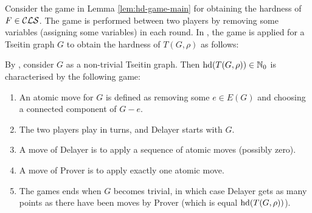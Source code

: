 \documentclass{report}
\begin{document}
Consider the game in Lemma \ref{lem:hd-game-main} for obtaining the hardness of $F \in \mathcal{CLS}$. The game is performed between two players by removing some variables (assigning some variables) in each round. In \cite{BeyersdorffKullmann2014PHP}, the game is applied for a Tseitin graph $G$ to obtain the hardness of $T(G,\rho)$ as follows:



\begin{lem}\label{lem:game-tseitin-hd}
By \cite{BeyersdorffKullmann2014PHP}, consider  $G$ as a non-trivial Tseitin graph. Then $\operatorname{hd}(T(G,\rho)) \in \mathbb{N}_0$ is characterised by the following game:
  \begin{enumerate}
  \item An atomic move for $G$ is defined as removing some $e \in E(G)$ and choosing a connected component of $G - e$. 
  \item The two players play in turns, and Delayer starts with $G$.
  \item A move of Delayer is to apply a sequence of atomic moves (possibly zero).
  \item A move of Prover is to apply exactly one atomic move.
  \item The games ends when $G$ becomes trivial, in which case Delayer gets as many points as there have been moves by Prover (which is equal $\operatorname{hd}(T(G,\rho))$).
  \end{enumerate}
\end{lem}
\end{document}
